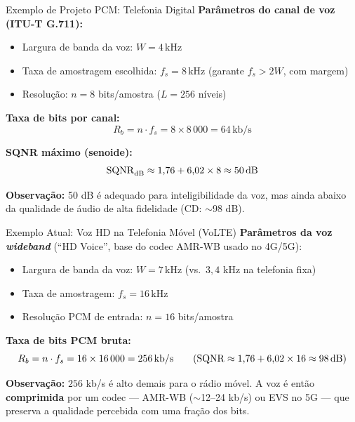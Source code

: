 \begin{frame}{Exemplo de Projeto PCM: Telefonia Digital}
  \textbf{Parâmetros do canal de voz (ITU-T G.711):}

  \vspace{0.2cm}
  \begin{itemize}
    \item Largura de banda da voz: $W = 4\,\text{kHz}$
    \item Taxa de amostragem escolhida: $f_s = 8\,\text{kHz}$
          \quad (garante $f_s > 2W$, com margem)
    \item Resolução: $n = 8$ bits/amostra ($L = 256$ níveis)
  \end{itemize}

  \vspace{0.35cm}
  \textbf{Taxa de bits por canal:}
  \[
    R_b = n \cdot f_s = 8 \times 8\,000 = 64\,\text{kb/s}
  \]

  \textbf{SQNR máximo (senoide):}
  \[
    \mathrm{SQNR}_{\mathrm{dB}} \approx 1{,}76 + 6{,}02 \times 8 \approx 50\,\text{dB}
  \]

  \vspace{0.2cm}
  \textbf{Observação:} 50 dB é adequado para inteligibilidade da voz,
  mas ainda abaixo da qualidade de áudio de alta fidelidade (CD: $\sim$98 dB).
\end{frame}


\begin{frame}{Exemplo Atual: Voz HD na Telefonia Móvel (VoLTE)}
  \textbf{Parâmetros da voz \emph{wideband}} (``HD Voice'', base do
  codec AMR-WB usado no 4G/5G):

  \vspace{0.15cm}
  \begin{itemize}
    \item Largura de banda da voz: $W = 7\,\text{kHz}$
          \quad (vs.\ $3{,}4$ kHz na telefonia fixa)
    \item Taxa de amostragem: $f_s = 16\,\text{kHz}$
    \item Resolução PCM de entrada: $n = 16$ bits/amostra
  \end{itemize}

  \vspace{0.25cm}
  \textbf{Taxa de bits PCM bruta:}
  \[
    R_b = n \cdot f_s = 16 \times 16\,000 = 256\,\text{kb/s}
    \qquad (\mathrm{SQNR} \approx 1{,}76 + 6{,}02 \times 16 \approx 98\,\text{dB})
  \]

  \vspace{0.1cm}
  \textbf{Observação:} $256$ kb/s é alto demais para o rádio móvel. A voz
  é então \textbf{comprimida} por um codec — AMR-WB ($\sim$12--24 kb/s) ou
  EVS no 5G — que preserva a qualidade percebida com uma fração dos bits.
\end{frame}

